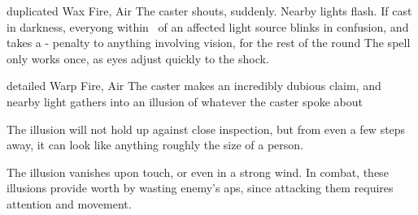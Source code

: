 \ifodd\value{diceNo}

  {duplicated}%
  {Wax}%
  {Fire, Air}%
  {}%
  {The caster shouts, suddenly.
  Nearby lights flash.
  If cast in darkness, everyong within \spellRange\ of an affected light source blinks in confusion, and takes a - penalty to anything involving vision, for the rest of the round}%
  {The spell only works once, as eyes adjust quickly to the shock.}

\else

  {detailed}%
  {Warp}%
  {Fire, Air}%
  {}%
  {The caster makes an incredibly dubious claim, and nearby light gathers into an illusion of whatever the caster spoke about}%
  {The illusion will not hold up against close inspection, but from even a few steps away, it can look like anything roughly the size of a person.

  The illusion vanishes upon touch, or even in a strong wind.
  In combat, these illusions provide worth by wasting enemy's \glspl{ap}, since attacking them requires attention and movement.}

\fi
